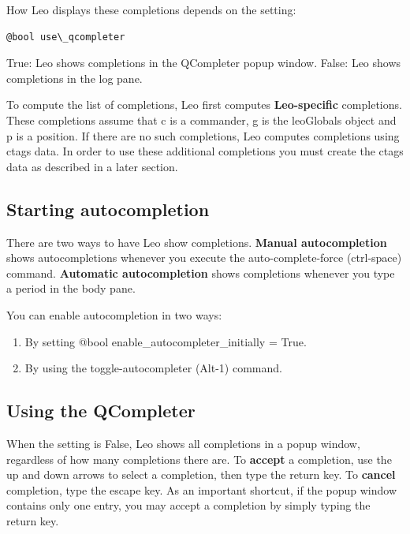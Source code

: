 \documentclass[a4paper,10pt,english]{sphinxmanual}
\begin{document}
How Leo displays these completions depends on the setting:

\begin{Verbatim}[commandchars=\\\{\}]
@bool use\_qcompleter
\end{Verbatim}

True: Leo shows completions in the QCompleter popup window.
False: Leo shows completions in the log pane.

To compute the list of completions, Leo first computes \textbf{Leo-specific}
completions. These completions assume that c is a commander, g is the
leoGlobals object and p is a position. If there are no such completions, Leo
computes completions using ctags data. In order to use these additional
completions you must create the ctags data as described in a later section.


\subsection{Starting autocompletion}
\label{commands:starting-autocompletion}
There are two ways to have Leo show completions. \textbf{Manual autocompletion}
shows autocompletions whenever you execute the auto-complete-force
(ctrl-space) command. \textbf{Automatic autocompletion} shows completions
whenever you type a period in the body pane.

You can enable autocompletion in two ways:
\begin{enumerate}
\item {} 
By setting @bool enable\_autocompleter\_initially = True.

\item {} 
By using the toggle-autocompleter (Alt-1) command.

\end{enumerate}


\subsection{Using the QCompleter}
\label{commands:using-the-qcompleter}
When the  setting is False, Leo shows all completions in a
popup window, regardless of how many completions there are. To \textbf{accept} a
completion, use the up and down arrows to select a completion, then type the
return key. To \textbf{cancel} completion, type the escape key. As an important
shortcut, if the popup window contains only one entry, you may accept a
completion by simply typing the return key.
\end{document}
